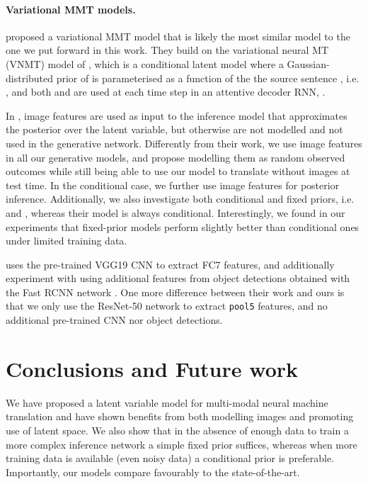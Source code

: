 \documentclass[11pt,a4paper]{article}
\begin{document}
\paragraph{Variational MMT models.} \citet{Toyamaetal2016} proposed a variational MMT model that is likely the most similar model to the one we put forward in this work.
They build on the variational neural MT (VNMT) model of \citet{Zhangetal2016}, which is a conditional latent model where a Gaussian-distributed prior of  is parameterised as a function of the the source sentence , i.e. , and both  and  are used at each time step in an attentive decoder RNN, .

In \citet{Toyamaetal2016}, image features are used as input to the inference model  that approximates the posterior over the latent variable, but otherwise are not modelled and not used in the generative network.
Differently from their work, we use image features in all our generative models, and propose modelling them as random observed outcomes while still being able to use our model to translate without images at test time.
In the conditional case, we further use image features for posterior inference. 
Additionally, we also investigate both conditional and fixed priors, i.e.  and , whereas their model is always conditional.
Interestingly, we found in our experiments that fixed-prior models perform slightly better than conditional ones under limited training data.

\citet{Toyamaetal2016} uses the pre-trained VGG19 CNN \citep{SimonyanZisserman2014} to extract FC7 features, and additionally experiment with using additional features from object detections obtained with the Fast RCNN network \citep{Girshick2015}.
One more difference between their work and ours is that we only use the ResNet-50 network to extract \texttt{pool5} features, and no additional pre-trained CNN nor object detections.
 
\section{Conclusions and Future work}\label{sec:conclusions}

We have proposed a latent variable model for multi-modal neural machine translation and have shown benefits from both modelling images and promoting use of latent space.
We also show that in the absence of enough data to train a more complex inference network a simple fixed prior suffices, whereas when more training data is available (even noisy data) a conditional prior is preferable. 
Importantly, our models compare favourably to the state-of-the-art.
\end{document}
